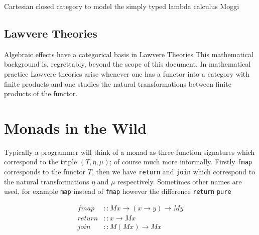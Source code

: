 \documentclass[a4paper,10pt]{article}
\theoremstyle{definition}
\begin{document}
Cartesian closed category to model the simply typed lambda calculus
Moggi


\subsection{Lawvere Theories}
Algebraic effects have a categorical basis in Lawvere Theories
This mathematical background is, regrettably, beyond the scope of this document.
In mathematical practice Lawvere theories arise whenever one has a functor into a category with finite products and one studies the natural transformations between finite products of the functor.
\cite{hyland2007category}

\section{Monads in the Wild}
Typically a programmer will think of a monad as three function signatures
which correspond to the triple $(T,\eta,\mu)$;
of course much more informally.
Firstly \texttt{fmap} corresponds to the functor $T$,
then we have \texttt{return} and \texttt{join} which correspond to
the natural transformations $\eta$ and $\mu$ respectively.
Sometimes other names are used,
for example \texttt{map} instead of \texttt{fmap} however the difference
\texttt{return}
\texttt{pure}

\begin{equation}
  \begin{split}
    fmap   &:: M x \rightarrow (x \rightarrow y) \rightarrow M y \\
    return &:: x \rightarrow M x                                 \\
    join   &:: M (M x) \rightarrow M x
  \end{split}
\end{equation}
\end{document}

